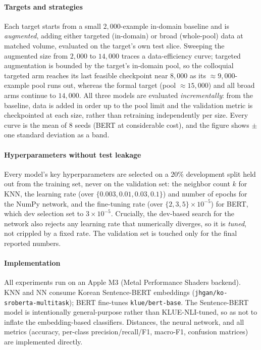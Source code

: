 \documentclass[conference]{IEEEtran}
\begin{document}
\paragraph*{Targets and strategies}
Each target starts from a small $2{,}000$-example in-domain baseline and
is \emph{augmented}, adding either targeted (in-domain) or broad
(whole-pool) data at matched volume, evaluated on the target's own test
slice. Sweeping the augmented size from $2{,}000$ to $14{,}000$ traces a
data-efficiency curve; targeted augmentation is bounded by the target's
in-domain pool, so the colloquial targeted arm reaches its last feasible
checkpoint near $8{,}000$ as its $\approx 9{,}000$-example pool runs out,
whereas the formal target (pool $\approx 15{,}000$) and all broad arms
continue to $14{,}000$. All three models are
evaluated \emph{incrementally}: from the baseline, data is added in order
up to the pool limit and the validation metric is checkpointed at each
size, rather than retraining independently per size. Every curve is the
mean of $8$ seeds (BERT at considerable cost), and the figure shows
$\pm$one standard deviation as a band.

\paragraph*{Hyperparameters without test leakage}
Every model's key hyperparameters are selected on a $20\%$ development
split held out from the training set, never on the validation set: the
neighbor count $k$ for KNN, the learning rate (over
$\{0.003, 0.01, 0.03, 0.1\}$) and number of epochs for the NumPy network,
and the fine-tuning rate (over $\{2,3,5\}\times10^{-5}$) for BERT, which
dev selection set to $3\times10^{-5}$. Crucially, the dev-based search for
the network also rejects any learning rate that numerically diverges, so
it is \emph{tuned}, not crippled by a fixed rate. The validation set is
touched only for the final reported numbers.

\paragraph*{Implementation}
All experiments run on an Apple M3 (Metal Performance Shaders backend).
KNN and NN consume Korean Sentence-BERT embeddings
(\texttt{jhgan/ko-sroberta-multitask}); BERT fine-tunes
\texttt{klue/bert-base}. The Sentence-BERT model is intentionally
general-purpose rather than KLUE-NLI-tuned, so as not to inflate the
embedding-based classifiers. Distances, the neural network, and all
metrics (accuracy, per-class precision/recall/F1, macro-F1, confusion
matrices) are implemented directly.
\end{document}
